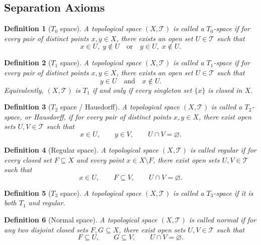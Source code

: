 \documentclass[12pt]{article}
\newtheorem{definition}{Definition}
\begin{document}
\subsection*{Separation Axioms}

\begin{definition}[$T_0$ space]
A topological space $(X,\mathcal{T})$ is called a \emph{$T_0$-space} if for every pair of distinct points $x,y \in X$, there exists an open set $U \in \mathcal{T}$ such that
\[
x \in U,\; y \notin U
\quad \text{or} \quad
y \in U,\; x \notin U.
\]
\end{definition}

\begin{definition}[$T_1$ space]
A topological space $(X,\mathcal{T})$ is called a \emph{$T_1$-space} if for every pair of distinct points $x,y \in X$, there exists an open set $U \in \mathcal{T}$ such that
\[
y \in U \quad \text{and} \quad x \notin U.
\]
Equivalently, $(X,\mathcal{T})$ is $T_1$ if and only if every singleton set $\{x\}$ is closed in $X$.
\end{definition}

\begin{definition}[$T_2$ space / Hausdorff]
A topological space $(X,\mathcal{T})$ is called a \emph{$T_2$-space}, or \emph{Hausdorff}, if for every pair of distinct points $x,y \in X$, there exist open sets $U,V \in \mathcal{T}$ such that
\[
x \in U, \qquad y \in V, \qquad U \cap V = \varnothing.
\]
\end{definition}

\begin{definition}[Regular space]
A topological space $(X,\mathcal{T})$ is called \emph{regular} if for every closed set $F \subseteq X$ and every point $x \in X \setminus F$, there exist open sets $U,V \in \mathcal{T}$ such that
\[
x \in U, \qquad F \subseteq V, \qquad U \cap V = \varnothing.
\]
\end{definition}

\begin{definition}[$T_3$ space]
A topological space $(X,\mathcal{T})$ is called a \emph{$T_3$-space} if it is both $T_1$ and regular.
\end{definition}

\begin{definition}[Normal space]
A topological space $(X,\mathcal{T})$ is called \emph{normal} if for any two disjoint closed sets $F,G \subseteq X$, there exist open sets $U,V \in \mathcal{T}$ such that
\[
F \subseteq U, \qquad G \subseteq V, \qquad U \cap V = \varnothing.
\]
\end{definition}
\end{document}
